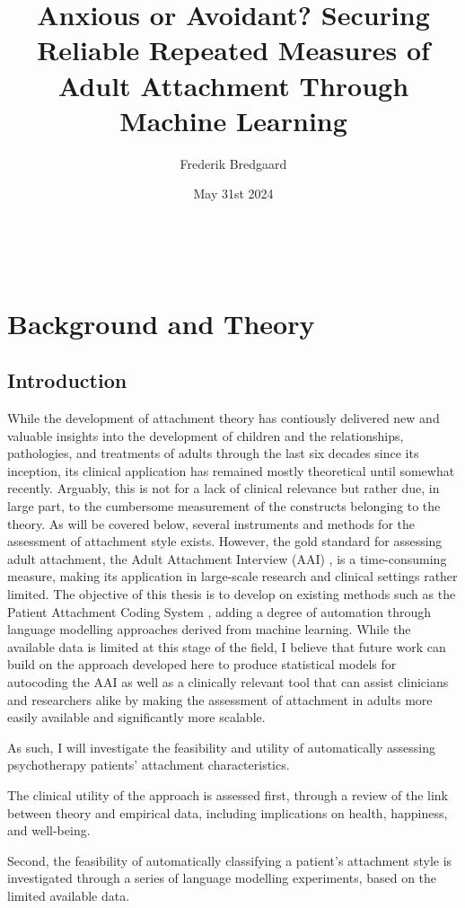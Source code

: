 \documentclass[12pt]{report}
\title{Anxious or Avoidant? Securing Reliable Repeated Measures of Adult Attachment Through Machine Learning}
\author{Frederik Bredgaard}
\date{May 31st 2024}
\begin{document}
\maketitle
\
\tableofcontents

\chapter{Background and Theory}
\section{Introduction}
While the development of attachment theory has contiously delivered new and valuable insights into the development of children and the relationships, pathologies, and treatments of adults through the last six decades since its inception, its clinical application has remained mostly theoretical until somewhat recently. Arguably, this is not for a lack of clinical relevance but rather due, in large part, to the cumbersome measurement of the constructs belonging to the theory. As will be covered below, several instruments and methods for the assessment of attachment style exists. However, the gold standard for assessing adult attachment, the Adult Attachment Interview (AAI) \cite{AAITest}, is a time-consuming measure, making its application in large-scale research and clinical settings rather limited. The objective of this thesis is to develop on existing methods such as the Patient Attachment Coding System \cite{Talia2017}, adding a degree of automation through language modelling approaches derived from machine learning. While the available data is limited at this stage of the field, I believe that future work can build on the approach developed here to produce statistical models for autocoding the AAI as well as a clinically relevant tool that can assist clinicians and researchers alike by making the assessment of attachment in adults more easily available and significantly more scalable.

As such, I will investigate the feasibility and utility of automatically assessing psychotherapy patients' attachment characteristics.

The clinical utility of the approach is assessed first, through a review of the link between theory and empirical data, including implications on health, happiness, and well-being.

Second, the feasibility of automatically classifying a patient's attachment style is investigated through a series of language modelling experiments, based on the limited available data.
\end{document}
